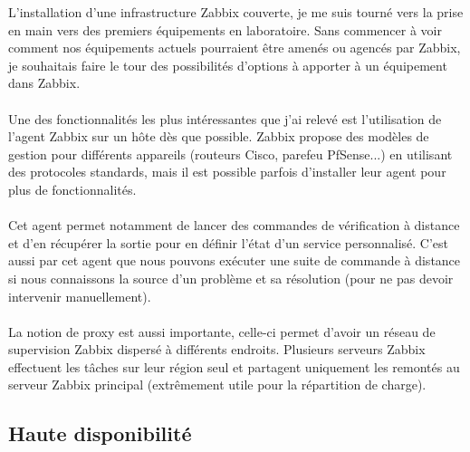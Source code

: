 L'installation d'une infrastructure Zabbix couverte, je me suis tourné vers la prise en main vers des premiers équipements en laboratoire. Sans commencer à voir comment nos équipements actuels pourraient être amenés ou agencés par Zabbix, je souhaitais faire le tour des possibilités d'options à apporter à un équipement dans Zabbix.
\\ \\
Une des fonctionnalités les plus intéressantes que j'ai relevé est l'utilisation de l'agent Zabbix sur un hôte dès que possible. Zabbix propose des modèles de gestion pour différents appareils (routeurs Cisco, parefeu PfSense...) en utilisant des protocoles standards, mais il est possible parfois d'installer leur agent pour plus de fonctionnalités.
\\ \\
Cet agent permet notamment de lancer des commandes de vérification à distance et d'en récupérer la sortie pour en définir l'état d'un service personnalisé. C'est aussi par cet agent que nous pouvons exécuter une suite de commande à distance si nous connaissons la source d'un problème et sa résolution (pour ne pas devoir intervenir manuellement).
\\ \\
La notion de proxy est aussi importante, celle-ci permet d'avoir un réseau de supervision Zabbix dispersé à différents endroits. Plusieurs serveurs Zabbix effectuent les tâches sur leur région seul et partagent uniquement les remontés au serveur Zabbix principal (extrêmement utile pour la répartition de charge).

\subsection{Haute disponibilité}

